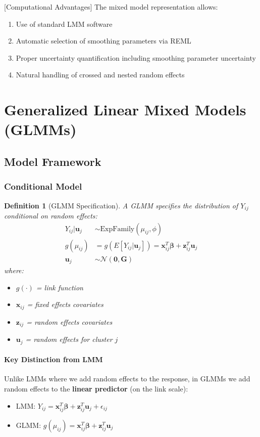 \documentclass{article}
\newtheorem{definition}{Definition}
\begin{document}
[Computational Advantages]
The mixed model representation allows:
\begin{enumerate}
    \item Use of standard LMM software
    \item Automatic selection of smoothing parameters via REML
    \item Proper uncertainty quantification including smoothing parameter uncertainty
    \item Natural handling of crossed and nested random effects
\end{enumerate}


\section{Generalized Linear Mixed Models (GLMMs)}

\subsection{Model Framework}

\subsubsection{Conditional Model}

\begin{definition}[GLMM Specification]
A GLMM specifies the distribution of $Y_{ij}$ conditional on random effects:
\begin{align}
Y_{ij}|\mathbf{u}_j &\sim \text{ExpFamily}(\mu_{ij}, \phi) \\
g(\mu_{ij}) &= g(E[Y_{ij}|\mathbf{u}_j]) = \mathbf{x}_{ij}^T\boldsymbol{\beta} + \mathbf{z}_{ij}^T\mathbf{u}_j \\
\mathbf{u}_j &\sim \mathcal{N}(\mathbf{0}, \mathbf{G})
\end{align}
where:
\begin{itemize}
    \item $g(\cdot)$ = link function
    \item $\mathbf{x}_{ij}$ = fixed effects covariates
    \item $\mathbf{z}_{ij}$ = random effects covariates
    \item $\mathbf{u}_j$ = random effects for cluster $j$
\end{itemize}
\end{definition}

\paragraph*{Key Distinction from LMM}
Unlike LMMs where we add random effects to the response, in GLMMs we add random effects to the \textbf{linear predictor} (on the link scale):
\begin{itemize}
    \item LMM: $Y_{ij} = \mathbf{x}_{ij}^T\boldsymbol{\beta} + \mathbf{z}_{ij}^T\mathbf{u}_j + \epsilon_{ij}$
    \item GLMM: $g(\mu_{ij}) = \mathbf{x}_{ij}^T\boldsymbol{\beta} + \mathbf{z}_{ij}^T\mathbf{u}_j$
\end{itemize}
\end{document}
